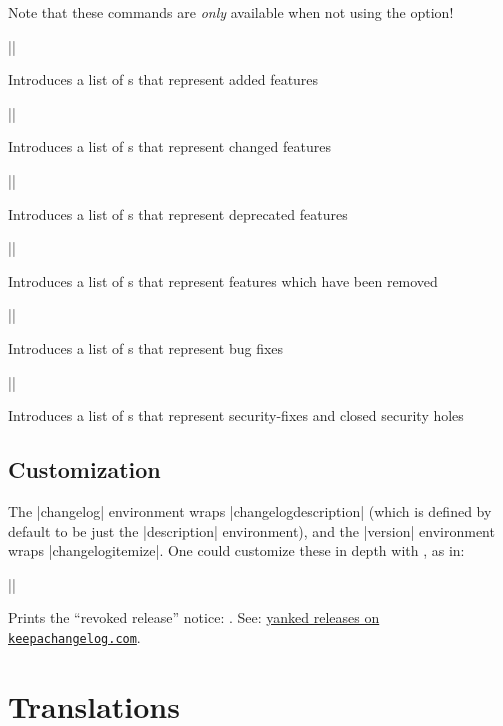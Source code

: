 \documentclass{ltxguidex}
\begin{document}
Note that these commands are \emph{only} available when not using
the  option!

\begin{desc}|\added|\end{desc}Introduces a list of s that represent added
	features
\begin{desc}|\changed|\end{desc}Introduces a list of s that represent
	changed features
\begin{desc}|\deprecated|\end{desc}Introduces a list of s that represent
	deprecated features
\begin{desc}|\removed|\end{desc}Introduces a list of s that represent
	features which have been removed
\begin{desc}|\fixed|\end{desc}Introduces a list of s that represent bug
	fixes
\begin{desc}|\security|\end{desc}Introduces a list of s that represent
	security-fixes and closed security holes

\subsection{Customization}

The |changelog| environment wraps |changelogdescription| (which is
defined by default to be just the |description| environment), and the
|version| environment wraps |changelogitemize|. One could customize
these in depth with , as in:

\begin{latexcode}
\usepackage{enumitem}
\renewenvironment{changelogitemize}
	{\begin{itemize}[label=---]}
	{\end{itemize}}
\end{latexcode}

\begin{desc}
|\changelogyanked|
\end{desc}
Prints the ``revoked release'' notice:
\changelogyanked. See:
\href{https://keepachangelog.com/en/1.0.0/#yanked}{yanked releases on
\texttt{keepachangelog.com}}.

\section{Translations}
\end{document}
